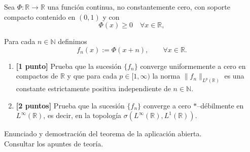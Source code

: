 \documentclass[12pt]{article}
\begin{document}
    \begin{ejercicio}[3 puntos]
    Sea $\Phi : \mathbb{R}\to\mathbb{R}$ una función continua, no constantemente cero, con soporte compacto contenido en $(0,1)$  y con
    \[
    \Phi(x)\ge 0 \quad \forall x\in\mathbb{R},
    \]
    
    Para cada $n\in\mathbb{N}$ definimos
    \[
    f_n(x) := \Phi(x+n), \qquad \forall x\in\mathbb{R}.
    \]
    
    \begin{enumerate}
    \item \textbf{[1 punto]}  
    Prueba que la sucesión $\{f_n\}$ converge uniformemente a cero en compactos de $\mathbb{R}$
    y que para cada $p\in[1,\infty)$ la norma $\|f_n\|_{L^p(\mathbb{R})}$ es una constante
    estrictamente positiva independiente de $n\in\mathbb{N}$.
    
    \item \textbf{[2 puntos]}  
    Prueba que la sucesión $\{f_n\}$ converge a cero $\ast$--débilmente en $L^\infty(\mathbb{R})$,
    es decir, en la topología $\sigma(L^\infty(\mathbb{R}),L^1(\mathbb{R}))$.
    \end{enumerate}
    \end{ejercicio}
    
    \newpage
    \setcounter{ejercicio}{0} %

    \begin{ejercicio}[2 puntos]
    Enunciado y demostración del teorema de la aplicación abierta.\\

    Consultar los apuntes de teoría.
    \end{ejercicio}
    
\end{document}
